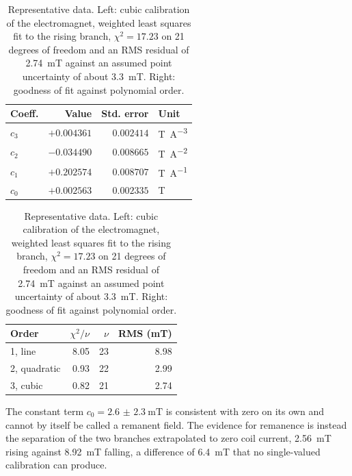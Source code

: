 \documentclass[11pt,a4paper]{article}
\begin{document}
\begin{table}[htbp]
\centering
\caption{Representative data. Left: cubic calibration of the electromagnet, weighted least
squares fit to the rising branch, $\chi^2 = 17.23$ on \num{21} degrees of freedom and an RMS
residual of \qty{2.74}{\milli\tesla} against an assumed point uncertainty of about
\qty{3.3}{\milli\tesla}. Right: goodness of fit against polynomial order.}
\label{tab:calfit}
\begin{minipage}[t]{0.52\textwidth}\vspace{0pt}
\centering
\begin{tabular}{lrrl}
\toprule
Coeff. & Value & Std. error & Unit \\
\midrule
$c_3$ & $+0.004361$ & $0.002414$ & \unit{\tesla\per\ampere\cubed} \\
$c_2$ & $-0.034490$ & $0.008665$ & \unit{\tesla\per\ampere\squared} \\
$c_1$ & $+0.202574$ & $0.008707$ & \unit{\tesla\per\ampere} \\
$c_0$ & $+0.002563$ & $0.002335$ & \unit{\tesla} \\
\bottomrule
\end{tabular}
\end{minipage}%
\begin{minipage}[t]{0.48\textwidth}\vspace{0pt}
\centering
\begin{tabular}{lrrr}
\toprule
Order & $\chi^2/\nu$ & $\nu$ & RMS (\unit{\milli\tesla}) \\
\midrule
1, line      & 8.05 & 23 & 8.98 \\
2, quadratic & 0.93 & 22 & 2.99 \\
3, cubic     & 0.82 & 21 & 2.74 \\
\bottomrule
\end{tabular}
\end{minipage}
\end{table}

The constant term $c_0 = \qty{2.6(23)}{\milli\tesla}$ is consistent with zero on its own and
cannot by itself be called a remanent field. The evidence for remanence is instead the
separation of the two branches extrapolated to zero coil current, \qty{2.56}{\milli\tesla}
rising against \qty{8.92}{\milli\tesla} falling, a difference of \qty{6.4}{\milli\tesla} that
no single-valued calibration can produce.
\end{document}
